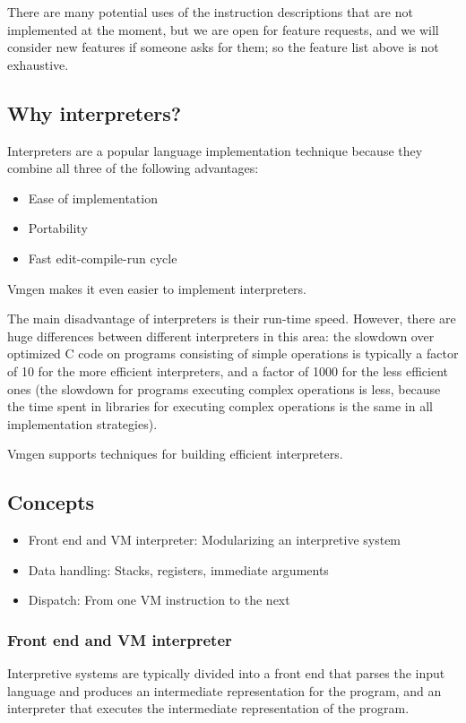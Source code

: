 \documentclass[10pt,english]{article}
\begin{document}
There are many potential uses of the instruction descriptions that
are not implemented at the moment, but we are open for feature requests,
and we will consider new features if someone asks for them; so the
feature list above is not exhaustive.


\subsection{Why interpreters?}

Interpreters are a popular language implementation technique because
they combine all three of the following advantages:
\begin{itemize}
\item Ease of implementation
\item Portability
\item Fast edit-compile-run cycle
\end{itemize}
Vmgen makes it even easier to implement interpreters.

The main disadvantage of interpreters is their run-time speed. However,
there are huge differences between different interpreters in this
area: the slowdown over optimized C code on programs consisting of
simple operations is typically a factor of 10 for the more efficient
interpreters, and a factor of 1000 for the less efficient ones (the
slowdown for programs executing complex operations is less, because
the time spent in libraries for executing complex operations is the
same in all implementation strategies).

Vmgen supports techniques for building efficient interpreters.


\subsection{Concepts}
\begin{itemize}
\item Front end and VM interpreter: Modularizing an interpretive system
\item Data handling: Stacks, registers, immediate arguments
\item Dispatch: From one VM instruction to the next
\end{itemize}

\subsubsection{Front end and VM interpreter}

Interpretive systems are typically divided into a front end that parses
the input language and produces an intermediate representation for
the program, and an interpreter that executes the intermediate representation
of the program.
\end{document}
